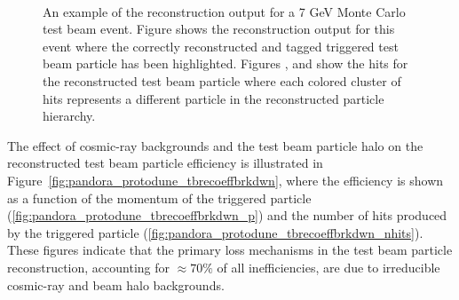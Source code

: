 \begin{figure}[!ht]%
\centering
{} \\ 
\caption[Pandora reconstruction output for \SI{7}{GeV} MC test beam event]{An example of the  reconstruction output for a 7 GeV Monte Carlo test beam event.  Figure \protect{} shows the \threed reconstruction output for this event where the correctly reconstructed and tagged triggered test beam particle has been highlighted.  Figures \protect{}, \protect{} and \protect{} show the \twod hits for the reconstructed test beam particle where each colored cluster of hits represents a different particle in the reconstructed particle hierarchy.}
\label{pandora_protodune_reco} 
\end{figure}

The effect of cosmic-ray backgrounds and the test beam particle halo on the reconstructed test beam particle efficiency is illustrated in Figure~\ref{fig:pandora_protodune_tbrecoeffbrkdwn}, where the efficiency is shown as a function of the momentum of the triggered particle (\ref{fig:pandora_protodune_tbrecoeffbrkdwn_p}) and the number of hits produced by the triggered particle (\ref{fig:pandora_protodune_tbrecoeffbrkdwn_nhits}).  These figures indicate that the primary loss mechanisms in the test beam particle reconstruction, accounting for $\approx 70\%$ of all inefficiencies, are due to irreducible cosmic-ray and  beam halo backgrounds.



